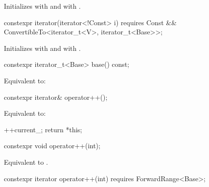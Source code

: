 \begin{itemdescr}
\pnum
\effects Initializes  with  and
 with .
\end{itemdescr}

%
\begin{itemdecl}
constexpr iterator(iterator<!Const> i)
  requires Const && ConvertibleTo<iterator_t<V>, iterator_t<Base>>;
\end{itemdecl}

\begin{itemdescr}
\pnum
\effects Initializes  with  and
 with .
\end{itemdescr}

\begin{itemdecl}
constexpr iterator_t<Base> base() const;
\end{itemdecl}

\begin{itemdescr}
\pnum
\effects Equivalent to: 
\end{itemdescr}

\begin{itemdecl}
constexpr iterator& operator++();
\end{itemdecl}

\begin{itemdescr}
\pnum
\effects Equivalent to:
\begin{codeblock}
++current_;
return *this;
\end{codeblock}
\end{itemdescr}

\begin{itemdecl}
constexpr void operator++(int);
\end{itemdecl}

\begin{itemdescr}
\pnum
\effects Equivalent to .
\end{itemdescr}

\begin{itemdecl}
constexpr iterator operator++(int) requires ForwardRange<Base>;
\end{itemdecl}

